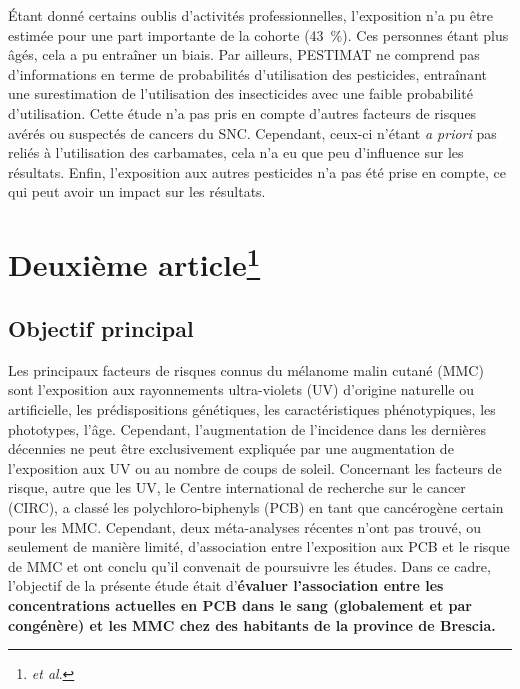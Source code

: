 \documentclass[10pt,english,french]{article}
\begin{document}
\'{E}tant donné certains oublis d'activités professionnelles, l'exposition n'a pu être estimée pour une part importante de la cohorte (43~\%). Ces personnes étant plus âgés, cela a pu entraîner un biais. Par ailleurs, PESTIMAT ne comprend pas d'informations en terme de probabilités d'utilisation des pesticides, entraînant une surestimation de l'utilisation des insecticides avec une faible probabilité d'utilisation. Cette étude n'a pas pris en compte d'autres facteurs de risques avérés ou suspectés de cancers du SNC. Cependant, ceux-ci n'étant \emph{a priori} pas reliés à l'utilisation des carbamates, cela n'a eu que peu d'influence sur les résultats. Enfin, l'exposition aux autres pesticides n'a pas été prise en compte, ce qui peut avoir un impact sur les résultats. 

\newpage

\section{Deuxième article\protect\footnote{ \emph{et al}. }}

\subsection{Objectif principal}
Les principaux facteurs de risques connus du mélanome malin cutané (MMC) sont l'exposition aux rayonnements ultra-violets (UV) d'origine naturelle ou artificielle, les prédispositions génétiques, les caractéristiques phénotypiques, les phototypes, l'âge. Cependant, l'augmentation de l'incidence dans les dernières décennies ne peut être exclusivement expliquée par une augmentation de l'exposition aux UV ou au nombre de coups de soleil. Concernant les facteurs de risque, autre que les UV, le Centre international de recherche sur le cancer (CIRC), a classé les polychloro-biphenyls (PCB) en tant que cancérogène certain pour les MMC.
Cependant, deux méta-analyses récentes n'ont pas trouvé, ou seulement de manière limité, d'association entre l'exposition aux PCB et le risque de MMC et ont conclu qu'il convenait de poursuivre les études. Dans ce cadre, l'objectif de la présente étude était d'\textbf{évaluer l'association entre les concentrations actuelles en PCB dans le sang (globalement et par congénère) et les MMC chez des habitants de la province de Brescia.}
\end{document}
